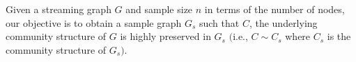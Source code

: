 
\begin{mydef}
Given a streaming graph $G$ and sample size $n$ in terms of the number of nodes, our objective is to obtain a sample graph $G_s$ such that $C$, the underlying community structure of $G$ is highly preserved in $G_s$  $($i.e., $C \sim C_s$ where $C_s$ is the community structure of $G_s)$. 
\end{mydef}

